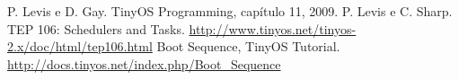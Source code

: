 \documentclass[a4paper,onecolumn, 10pt]{article}
\begin{document}
\pagebreak

\begin{thebibliography}{9}
 P. Levis e D. Gay. TinyOS Programming, capítulo 11, 2009.
 P. Levis e C. Sharp. TEP 106: Schedulers and Tasks.
                    \url{http://www.tinyos.net/tinyos-2.x/doc/html/tep106.html}
 Boot Sequence, TinyOS Tutorial. \url{http://docs.tinyos.net/index.php/Boot_Sequence}
\end{thebibliography}
\end{document}
